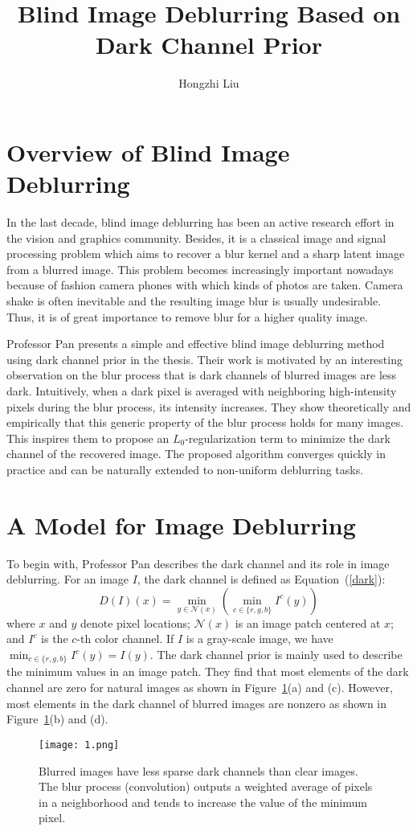 \documentclass[twocolumn]{article}
\author{Hongzhi Liu}
\title{Blind Image Deblurring Based on Dark Channel Prior}
\begin{document}
	\maketitle
	\par
	\section{Overview of Blind Image Deblurring}
	In the last decade, blind image deblurring has been an active research effort in the vision and graphics community. Besides, it is a classical image and signal processing problem which aims to recover a blur kernel and a sharp latent image from a blurred image. This problem becomes increasingly important nowadays because of fashion camera phones with which kinds of photos are taken. Camera shake is often inevitable and the resulting image blur is usually undesirable. Thus, it is of great importance to remove blur for a higher quality image.
	
	Professor Pan presents a simple and effective blind image deblurring method using dark channel prior in the thesis\cite{Pan2016Blind}. Their work is motivated by an interesting observation on the blur process that is dark channels of blurred images are less dark. Intuitively, when a dark pixel is averaged with neighboring high-intensity pixels during the blur process, its intensity increases. They show theoretically and empirically that this generic property of the blur process holds for many images. This inspires them to propose an $L_0$-regularization term to minimize the dark channel of the recovered image. The proposed algorithm converges quickly in practice and can be naturally extended to non-uniform deblurring tasks.

	\section{A Model for Image Deblurring}	
	To begin with, Professor Pan describes the dark channel and its role in image deblurring. For an image $I$, the dark channel\cite{He2011Single} is defined as Equation~(\ref{dark}):
	\begin{equation}
	D(I)(x)=\min_{y\in \mathcal{N}(x)}(\min_{c\in \{r,g,b\}}I^c(y))     \label{dark}
	\end{equation}
	where $x$ and $y$ denote pixel locations; $\mathcal{N}(x)$ is an image patch centered at $x$; and $I^c$ is the $c$-th color channel. If $I$ is a gray-scale image, we have $\min_{c\in\{r,g,b\}}I^c(y) = I(y)$. The dark channel prior is mainly used to describe the minimum values in an image patch. They find that most elements of the dark channel are zero for natural images as shown in Figure~\ref{fig1}(a) and (c). However, most elements in the dark channel of blurred images are nonzero as shown in Figure~\ref{fig1}(b) and (d).
	\begin{figure}[htbp] 
		\centering
		\texttt{[image: 1.png]} 
		\caption{Blurred images have less sparse dark channels than clear images. The blur process (convolution) outputs a weighted average of pixels in a neighborhood and tends to increase the value of the minimum pixel.}\label{fig1}  
	\end{figure}
\end{document}
